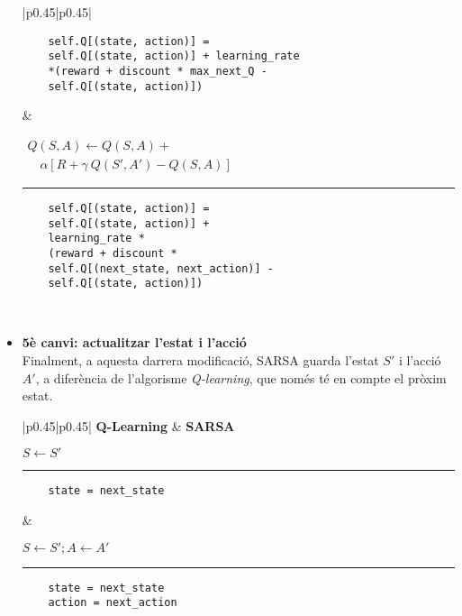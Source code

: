 \documentclass{article}
\begin{document}
\begin{itemize}
\begin{table}[h]
\begin{tabular}{|p{0.45\textwidth}|p{0.45\textwidth}|}
\begin{minipage}{\linewidth}
\begin{verbatim}
    self.Q[(state, action)] =
    self.Q[(state, action)] + learning_rate
    *(reward + discount * max_next_Q -
    self.Q[(state, action)])
\end{verbatim}
\end{minipage}
&
\begin{minipage}{\linewidth}
\begin{algorithmic}[H]
\STATE $\begin{aligned}
Q(S,A) \leftarrow Q(S,A) + \\
\quad \alpha[R + \gamma \ Q(S',A') - Q(S,A)]
\end{aligned}$
\end{algorithmic}
\noindent\rule{\linewidth}{0.4pt} 
\begin{verbatim}
    self.Q[(state, action)] =
    self.Q[(state, action)] +
    learning_rate *
    (reward + discount *
    self.Q[(next_state, next_action)] -
    self.Q[(state, action)])
\end{verbatim}
\end{minipage} \\
\hline
\end{tabular}
\end{table}
    \item \textbf{5è canvi: actualitzar l'estat i l'acció}\\
    Finalment, a aquesta darrera modificació, SARSA guarda l'estat \(S'\) i l'acció \(A'\), a diferència de l'algorisme \textit{Q-learning}, que només té en compte el pròxim estat.
    \begin{table}[h]
\begin{tabular}{|p{0.45\textwidth}|p{0.45\textwidth}|}
\hline
\textbf{Q-Learning} & \textbf{SARSA} \\
\hline
\begin{minipage}{\linewidth}
\begin{algorithmic}[H]
\STATE $S \leftarrow S'$
\end{algorithmic}
\noindent\rule{\linewidth}{0.4pt} 
\begin{verbatim}
    state = next_state
\end{verbatim}
\end{minipage}
&
\begin{minipage}{\linewidth}
\begin{algorithmic}[H]
\STATE $S \leftarrow S'; A \leftarrow A'$
\end{algorithmic}
\noindent\rule{\linewidth}{0.4pt} 
\begin{verbatim}
    state = next_state
    action = next_action
\end{verbatim}
\end{minipage} \\
\hline
\end{tabular}
\end{table}
\end{itemize}
\end{document}
